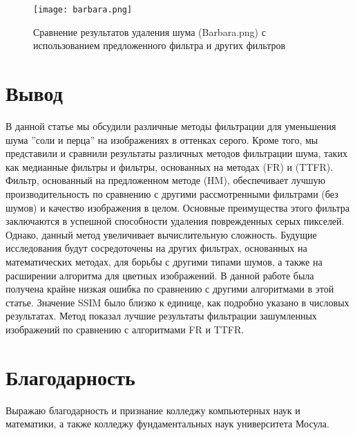 \begin{figure}[H]
    \centering
    \texttt{[image: barbara.png]}
    \caption{Сравнение результатов удаления шума (Barbara.png) 
    с использованием предложенного фильтра и других фильтров}
\end{figure}

\section{Вывод}

В данной статье мы обсудили различные методы фильтрации для уменьшения шума ''соли и перца'' на изображениях в оттенках серого. Кроме того, мы представили и сравнили
результаты различных методов фильтрации шума, таких как медианные фильтры и
фильтры, основанных на методах (FR) и (TTFR). Фильтр, основанный на предложенном
методе (HM), обеспечивает лучшую производительность по сравнению с другими
рассмотренными фильтрами (без шумов) и качество изображения в целом. Основные
преимущества этого фильтра заключаются в успешной способности удаления
поврежденных серых пикселей. Однако, данный метод увеличивает вычислительную
сложность. Будущие исследования будут сосредоточены на других фильтрах,
основанных на математических методах, для борьбы с другими типами шумов, а также
на расширении алгоритма для цветных изображений. В данной работе была получена
крайне низкая ошибка по сравнению с другими алгоритмами в этой статье. Значение
SSIM было близко к единице, как подробно указано в числовых результатах. Метод
показал лучшие результаты фильтрации зашумленных изображений по
сравнению с алгоритмами FR и TTFR.

\section{Благодарность}

Выражаю благодарность и признание колледжу компьютерных наук и математики, а
также колледжу фундаментальных наук университета Мосула.

\newpage
\printbibliography[heading=bibintoc]


